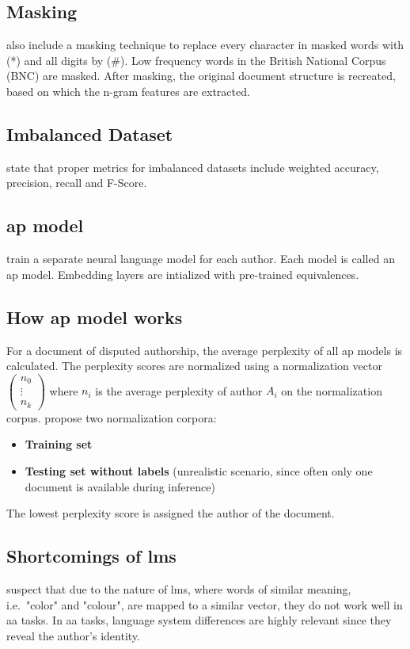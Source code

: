 \subsection{Masking}
\label{sec:topic_confusion_masking}
\citet{altakrori_topic_2021} also include a masking technique to replace every character in masked words with (*) and all digits by (\#).
Low frequency words in the British National Corpus (BNC) are masked.
After masking, the original document structure is recreated, based on which the n-gram features are extracted.

\subsection{Imbalanced Dataset}
\label{sec:topic_confusion_imbalanced_dataset}
\citet{altakrori_topic_2021} state that proper metrics for imbalanced datasets include 
weighted accuracy, precision, recall and F-Score.


\subsection{\ac{ap} model}
\label{sec:topic_confusion_ap_model}
\citet{altakrori_topic_2021} train a separate neural language model for each author.
Each model is called an \ac{ap} model.
Embedding layers are intialized with pre-trained equivalences.

\subsection{How \ac{ap} model works}
\label{sec:topic_confusion_ap_model_works}
For a document of disputed authorship, the average perplexity of all \ac{ap} models is calculated.
The perplexity scores are normalized using a normalization vector $\begin{pmatrix}
    n_0
     \\\vdots 
     \\n_k
    
    \end{pmatrix}$
where $n_i$ is the average perplexity of author $A_i$ on the normalization corpus.
\citet{altakrori_topic_2021} propose two normalization corpora:
\begin{itemize}
    \item \textbf{Training set}
    \item \textbf{Testing set without labels} (unrealistic scenario, since often only one document is available during inference)
\end{itemize}
The lowest perplexity score is assigned the author of the document.

\subsection{Shortcomings of \acp{lm}}
\label{sec:topic_confusion_shortcomings_lm}
\citet{altakrori_topic_2021} suspect that due to the nature of \acp{lm}, where words of similar meaning, i.e.\ "color" and "colour", 
are mapped to a similar vector, they do not work well in \ac{aa} tasks.
In \ac{aa} tasks, language system differences are highly relevant since they reveal the author's identity.  